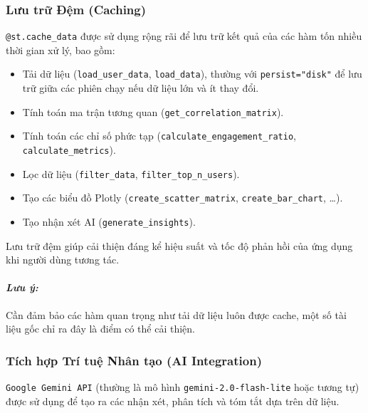 \subsubsection{Lưu trữ Đệm (Caching)}

\texttt{@st.cache\_data} được sử dụng rộng rãi để lưu trữ kết quả của các hàm tốn nhiều thời gian xử lý, bao gồm:
\begin{itemize}
    \item Tải dữ liệu (\texttt{load\_user\_data}, \texttt{load\_data}), thường với \texttt{persist="disk"} để lưu trữ giữa các phiên chạy nếu dữ liệu lớn và ít thay đổi.
    
    \item Tính toán ma trận tương quan (\texttt{get\_correlation\_matrix}).
    
    \item Tính toán các chỉ số phức tạp (\texttt{calculate\_engagement\_ratio}, \texttt{calculate\_metrics}).
    
    \item Lọc dữ liệu (\texttt{filter\_data}, \texttt{filter\_top\_n\_users}).
    
    \item Tạo các biểu đồ Plotly (\texttt{create\_scatter\_matrix}, \texttt{create\_bar\_chart}, \dots).
    
    \item Tạo nhận xét AI (\texttt{generate\_insights}).
\end{itemize}
Lưu trữ đệm giúp cải thiện đáng kể hiệu suất và tốc độ phản hồi của ứng dụng khi người dùng tương tác.

\paragraph{\textit{Lưu ý:}} Cần đảm bảo các hàm quan trọng như tải dữ liệu luôn được cache, một số tài liệu gốc chỉ ra đây là điểm có thể cải thiện.


\subsubsection{Tích hợp Trí tuệ Nhân tạo (AI Integration)}

\texttt{Google Gemini API} (thường là mô hình \texttt{gemini-2.0-flash-lite} hoặc tương tự) được sử dụng để tạo ra các nhận xét, phân tích và tóm tắt dựa trên dữ liệu.
    

